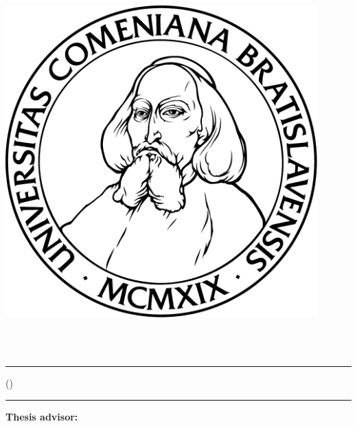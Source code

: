 \ifx\draft\undefined
\thispagestyle{empty}
\noindent
\begin{minipage}{0.20\textwidth}
	\includegraphics[width=0.9\textwidth]{../figures/logouni}
\end{minipage}
\begin{minipage}{0.79\textwidth}
	\begin{center}
		\sc \mfuniversity \\
		\mffaculty \\
		\mfdepartment  
	\end{center}
\end{minipage}

\vfill
\begin{center}
	\begin{minipage}{0.8\textwidth}
		\hrule
		\bigskip\bigskip
		\centerline{\LARGE\sc\mftitlea}
		\centerline{\LARGE\sc\mftitleb}
		\smallskip
		\centerline{(\mfthesistype)}
		\bigskip
		\bigskip
		\centerline{\large\sc\mfauthor}
		\bigskip\bigskip
		\hrule
	\end{minipage}
\end{center}
\vfill
{\bf Thesis advisor:} \mfadvisor
\hfill\mfplacedate
\eject %

\pagebreak
\fi


